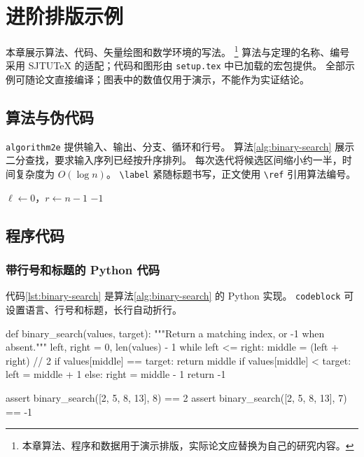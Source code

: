 
\chapter{进阶排版示例}
\label{chap:typesetting-examples}

本章展示算法、代码、矢量绘图和数学环境的写法。%
\footnote{本章算法、程序和数据用于演示排版，实际论文应替换为自己的研究内容。}
算法与定理的名称、编号采用 SJTUTeX 的适配；代码和图形由
\texttt{setup.tex} 中已加载的宏包提供。
全部示例可随论文直接编译；图表中的数值仅用于演示，不能作为实证结论。

\section{算法与伪代码}

\texttt{algorithm2e} 提供输入、输出、分支、循环和行号。
算法\ref{alg:binary-search} 展示二分查找，要求输入序列已经按升序排列。
每次迭代将候选区间缩小约一半，时间复杂度为 $O(\log n)$。
\texttt{\textbackslash label} 紧随标题书写，正文使用
\texttt{\textbackslash ref} 引用算法编号。

\begin{algorithm}[htbp]
  \caption{有序序列的二分查找}
  \label{alg:binary-search}
  $\ell \gets 0$，$r \gets n-1$\;
  \KwRet $-1$\;
\end{algorithm}

\section{程序代码}

\subsection{带行号和标题的 Python 代码}

代码\ref{lst:binary-search} 是算法\ref{alg:binary-search} 的 Python 实现。
\texttt{codeblock} 可设置语言、行号和标题，长行自动折行。

\begin{codeblock}[language=Python,float=htbp,numbers=left,numberstyle=\tiny\color{black!55},numbersep=8pt,caption={二分查找的 Python 实现},label={lst:binary-search},captionpos=b]
def binary_search(values, target):
    """Return a matching index, or -1 when absent."""
    left, right = 0, len(values) - 1
    while left <= right:
        middle = (left + right) // 2
        if values[middle] == target:
            return middle
        if values[middle] < target:
            left = middle + 1
        else:
            right = middle - 1
    return -1

assert binary_search([2, 5, 8, 13], 8) == 2
assert binary_search([2, 5, 8, 13], 7) == -1
\end{codeblock}

